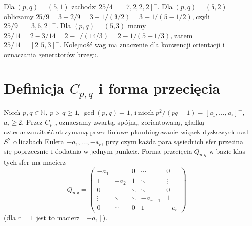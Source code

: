 \begin{przyklad}
Dla $(p,q)=(5,1)$ zachodzi $25/4=[7,2,2,2]^-$.
Dla $(p,q)=(5,2)$ obliczamy
$25/9=3-2/9=3-1/(9/2)=3-1/(5-1/2)$, czyli
$25/9=[3,5,2]^-$. Dla $(p,q)=(5,3)$ mamy
$25/14=2-3/14=2-1/(14/3)=2-1/(5-1/3)$,
zatem $25/14=[2,5,3]^-$. Kolejność wag ma znaczenie dla
konwencji orientacji i oznaczania generatorów brzegu.
\end{przyklad}

\section{Definicja \texorpdfstring{$C_{p,q}$}{Cpq} i forma przecięcia}
\label{sec:tg-general-config}

\begin{definicja}[Konfiguracja $C_{p,q}$]
Niech $p,q\in\mathbb N$, $p>q\geq1$, $\gcd(p,q)=1$, i niech
$p^2/(pq-1)=[a_1,\ldots,a_r]^-$, $a_i\geq2$.
Przez $C_{p,q}$ oznaczamy zwartą, spójną, zorientowaną,
gładką czterorozmaitość otrzymaną przez liniowe plumbingowanie
wiązek dyskowych nad $S^2$ o liczbach Eulera
$-a_1,\ldots,-a_r$, przy czym każda para sąsiednich sfer
przecina się poprzecznie i dodatnio w jednym punkcie.
Forma przecięcia $Q_{p,q}$ w bazie klas tych sfer ma macierz
\[
Q_{p,q}=\begin{pmatrix}
-a_1&1&0&\cdots&0\\
1&-a_2&1&\ddots&\vdots\\
0&1&\ddots&\ddots&0\\
\vdots&\ddots&\ddots&-a_{r-1}&1\\
0&\cdots&0&1&-a_r
\end{pmatrix}
\]
(dla $r=1$ jest to macierz $[-a_1]$).
\end{definicja}

\begin{center}
\end{center}

